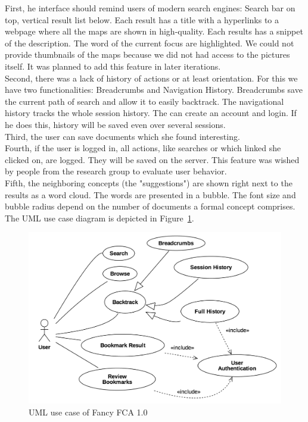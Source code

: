 \documentclass[11pt]{report}
\begin{document}
First, he interface should remind users of modern search engines: Search bar on top, vertical result list below. Each result has a title with a hyperlinks to a webpage where all the maps are shown in high-quality. Each results has a snippet of the description. The word of the current focus are highlighted. We could not provide thumbnails of the maps because we did not had access to the pictures itself. It was planned to add this feature in later iterations. \\

Second, there was a lack of history of actions or at least orientation. For this we have two functionalities: Breadcrumbs and Navigation History. Breadcrumbs save the current path of search and allow it to easily backtrack. The navigational history tracks the whole session history. The can create an account and login. If he does this, history will be saved even over several sessions. \\

Third, the user can save documents which she found interesting. \\

Fourth, if the user is logged in, all actions, like searches or which linked she clicked on, are logged. They will be saved on the server. This feature was wished by people from the research group to evaluate user behavior. \\

Fifth, the neighboring concepts (the "suggestions") are shown right next to the results as a word cloud. The words are presented in a bubble. The font size and bubble radius depend on the number of documents a formal concept comprises.\\

The UML use case diagram is depicted in Figure~\ref{figure:usecase}.

\begin{figure}[!ht]
	\centering
	\includegraphics[width=\linewidth]{images/usecase}
\caption{UML use case of Fancy FCA 1.0}
\label{figure:usecase}
\end{figure}
\end{document}
